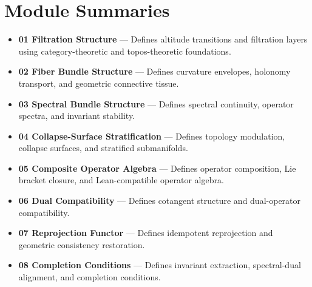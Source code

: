 \documentclass[11pt]{article}
\newcommand{\tileEng}[1]{\colorbox{eng!15}{\textbf{#1}}}
\newcommand{\tileGeo}[1]{\colorbox{geo!15}{\textbf{#1}}}
\newcommand{\tileAcc}[1]{\colorbox{acc!15}{\textbf{#1}}}
\begin{document}
\section*{Module Summaries}

\begin{itemize}[leftmargin=1.2cm]
    \item \tileEng{01 Filtration Structure} — Defines altitude transitions and
    filtration layers using category-theoretic and topos-theoretic foundations.

    \item \tileGeo{02 Fiber Bundle Structure} — Defines curvature envelopes,
    holonomy transport, and geometric connective tissue.

    \item \tileGeo{03 Spectral Bundle Structure} — Defines spectral continuity,
    operator spectra, and invariant stability.

    \item \tileGeo{04 Collapse-Surface Stratification} — Defines topology
    modulation, collapse surfaces, and stratified submanifolds.

    \item \tileEng{05 Composite Operator Algebra} — Defines operator
    composition, Lie bracket closure, and Lean-compatible operator algebra.

    \item \tileEng{06 Dual Compatibility} — Defines cotangent structure and
    dual-operator compatibility.

    \item \tileEng{07 Reprojection Functor} — Defines idempotent reprojection
    and geometric consistency restoration.

    \item \tileAcc{08 Completion Conditions} — Defines invariant extraction,
    spectral-dual alignment, and completion conditions.
\end{itemize}













\end{document}
